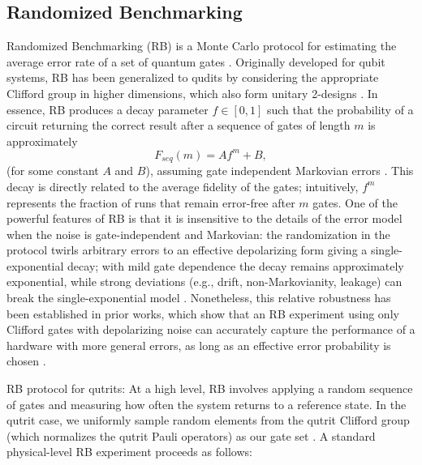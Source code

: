\subsection{Randomized Benchmarking}
Randomized Benchmarking (RB) is a Monte Carlo protocol for estimating the average error rate of a set of quantum gates \cite{Magesan2011PRL,Knill2008,Emerson2005}. Originally developed for qubit systems, RB has been generalized to qudits by considering the appropriate Clifford group in higher dimensions, which also form unitary 2-designs \cite{Appleby2005,Dankert2009,Gross2007}. In essence, RB produces a decay parameter $f \in [0,1]$ such that the probability of a circuit returning the correct result after a sequence of gates of length $m$ is approximately
\begin{equation}
F_{seq}(m) = Af^{m} + B,
\label{eq:fseq}
\end{equation}
(for some constant $A$ and $B$), assuming gate independent Markovian errors \cite{Magesan2011PRL,Magesan2012PRA}. This decay is directly related to the average fidelity of the gates; intuitively, $f^m$ represents the fraction of runs that remain error-free after $m$ gates. One of the powerful features of RB is that it is insensitive to the details of the error model when the noise is gate-independent and Markovian: the randomization in the protocol twirls arbitrary errors to an effective depolarizing form giving a single-exponential decay; with mild gate dependence the decay remains approximately exponential, while strong deviations (e.g., drift, non-Markovianity, leakage) can break the single-exponential model \cite{Emerson2005,Wallman2018}. Nonetheless, this relative robustness has been established in prior works, which show that an RB experiment using only Clifford gates with depolarizing noise can accurately capture the performance of a hardware with more general errors, as long as an effective error probability is chosen \cite{Magesan2011PRL,Proctor2019DRB}.

RB protocol for qutrits: At a high level, RB involves applying a random sequence of gates and measuring how often the system returns to a reference state. In the qutrit case, we uniformly sample random elements from the qutrit Clifford group (which normalizes the qutrit Pauli operators) as our gate set \cite{Appleby2005,Morvan2021}. A standard physical-level RB experiment proceeds as follows:

